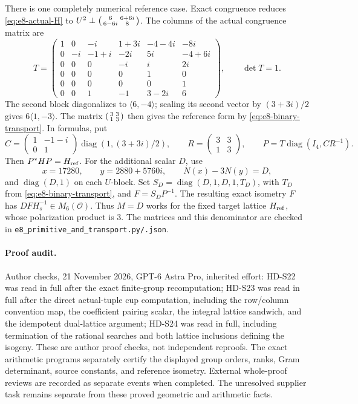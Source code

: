 There is one completely numerical reference case. Exact congruence
reduces \eqref{eq:e8-actual-H} to
\(U^2\perp\begin{psmallmatrix}6&6+6i\\6-6i&8\end{psmallmatrix}\).
The columns of the actual congruence matrix are
\[
 T=\begin{pmatrix}
 1&0&-i&1+3i&-4-4i&-8i\\
 0&-i&-1+i&-2i&5i&-4+6i\\
 0&0&0&-i&i&2i\\
 0&0&0&0&1&0\\
 0&0&0&0&0&1\\
 0&0&1&-1&3-2i&6
 \end{pmatrix},\qquad \det T=1.
\]
The second block diagonalizes to \(\langle6,-4\rangle\); scaling
its second vector by \((3+3i)/2\) gives \(6\langle1,-3\rangle\).
The matrix \(\begin{psmallmatrix}3&3\\1&3\end{psmallmatrix}\)
then gives the reference form by \eqref{eq:e8-binary-transport}.
In formulas, put
\[
 C=\begin{pmatrix}1&-1-i\\0&1\end{pmatrix}
       \operatorname{diag}(1,(3+3i)/2),\qquad
 R=\begin{pmatrix}3&3\\1&3\end{pmatrix},\qquad
 P=T\operatorname{diag}(I_4,CR^{-1}).
\]
Then \(P^*HP=H_{\rm ref}\).
For the additional scalar \(D\), use
\[
 x=17280,\qquad y=2880+5760i,
 \qquad N(x)-3N(y)=D,
\]
and \(\operatorname{diag}(D,1)\) on each \(U\)-block.
Set \(S_D=\operatorname{diag}(D,1,D,1,T_D)\), with \(T_D\)
from \eqref{eq:e8-binary-transport}, and \(F=S_DP^{-1}\).
The resulting exact isometry \(F\) has
\(D F H_s^{-1}\in M_6(\mathcal O)\).
Thus \(M=D\) works for the fixed target lattice \(H_{\rm ref}\),
whose polarization product is 3. The matrices and this denominator
are checked in \texttt{e8\_primitive\_and\_transport.py/.json}.

\paragraph{Proof audit.}
Author checks, 21 November 2026, GPT-6 Astra Pro, inherited effort:
HD-S22 was read in full after the exact finite-group recomputation;
HD-S23 was read in full after the direct actual-tuple cup computation,
including the row/column convention map, the coefficient pairing scalar,
the integral lattice sandwich, and the idempotent dual-lattice argument;
HD-S24 was read in full, including termination of the rational searches
and both lattice inclusions defining the isogeny. These are author
proof checks, not independent reproofs. The exact arithmetic programs
separately certify the displayed group orders, ranks, Gram determinant,
source constants, and reference isometry. External whole-proof reviews
are recorded as separate events when completed. The unresolved supplier
task remains separate from these proved geometric and arithmetic facts.
